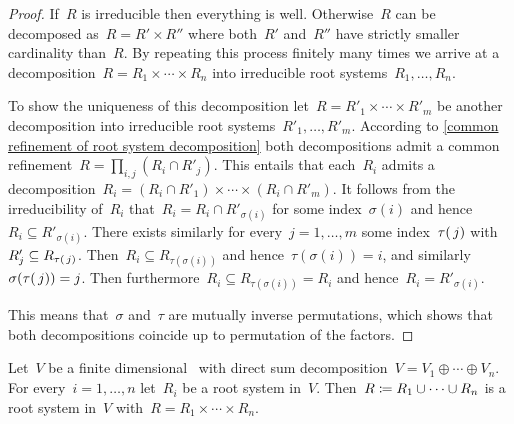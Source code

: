 \begin{proof}
  If~$R$ is irreducible then everything is well.
  Otherwise~$R$ can be decomposed as~$R = R' \times R''$ where both~$R'$ and~$R''$ have strictly smaller cardinality than~$R$.
  By repeating this process finitely many times we arrive at a decomposition~$R = R_1 \times \dotsb \times R_n$ into irreducible root systems~$R_1, \dotsc, R_n$.
  
  To show the uniqueness of this decomposition let~$R = R'_1 \times \dotsb \times R'_m$ be another decomposition into irreducible root systems~$R'_1, \dotsc, R'_m$.
  According to \cref{common refinement of root system decomposition} both decompositions admit a common refinement~$R = \prod_{i,j} (R_i \cap R'_j)$.
  This entails that each~$R_i$ admits a decomposition~$R_i = (R_i \cap R'_1) \times \dotsb \times (R_i \cap R'_m)$.
  It follows from the irreducibility of~$R_i$ that~$R_i = R_i \cap R'_{\sigma(i)}$ for some index~$\sigma(i)$ and hence~$R_i \subseteq R'_{\sigma(i)}$.
  There exists similarly for every~$j = 1, \dotsc, m$ some index~$\tau(\, j)$ with~$R'_j \subseteq R_{\tau(\, j)}$.
  Then~$R_i \subseteq R_{\tau(\sigma(i))}$ and hence~$\tau(\sigma(i)) = i$, and similarly~$\sigma(\tau(\, j)) = j$.
  Then furthermore~$R_i \subseteq R_{\tau(\sigma(i))} = R_i$ and hence~$R_i = R'_{\sigma(i)}$.
  
  This means that~$\sigma$ and~$\tau$ are mutually inverse permutations, which shows that both decompositions coincide up to permutation of the factors.
\end{proof}


\begin{lemma}
  \label{combining root systems}
  Let~$V$ be a finite dimensional~{\vectorspace{$\kf$}} with direct sum decomposition~$V = V_1 \oplus \dotsb \oplus V_n$.
  For every~$i = 1, \dotsc, n$ let~$R_i$ be a root system in~$V$.
  Then~$R \coloneqq R_1 \cup \dotsb \cup R_n$ is a root system in~$V$ with~$R = R_1 \times \dotsb \times R_n$.
\end{lemma}


